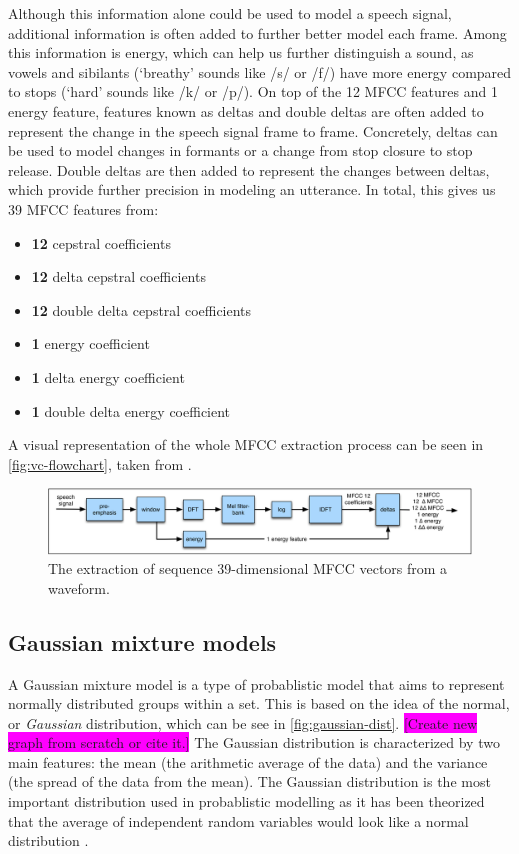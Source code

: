 \documentclass
[
    a4paper,
    twoside,
    12pt,
]
{report}
\begin{document}
Although this information alone could be used to model a speech signal,
additional information is often added to further better model each
frame. Among this information is energy, which can help us further
distinguish a sound, as vowels and sibilants (`breathy' sounds like /s/
or /f/) have more energy compared to stops (`hard' sounds like /k/ or
/p/). On top of the 12 MFCC features and 1 energy feature, features
known as deltas and double deltas are often added to represent the
change in the speech signal frame to frame. Concretely, deltas can be
used to model changes in formants or a change from stop closure to stop
release. Double deltas are then added to represent the changes between
deltas, which provide further precision in modeling an utterance. In
total, this gives us 39 MFCC features from:

\begin{itemize}
   \setlength\itemsep{-1em}
   \item{\textbf{12} cepstral coefficients}
   \item{\textbf{12} delta cepstral coefficients}
   \item{\textbf{12} double delta cepstral coefficients}
   \item{\textbf{1} energy coefficient}
   \item{\textbf{1} delta energy coefficient}
   \item{\textbf{1} double delta energy coefficient}
\end{itemize}

A visual representation of the whole MFCC extraction process can be seen
in \autoref{fig:vc-flowchart}, taken from \textcite{jurafsky2009}.

\begin{figure}[H]
\centering
\includegraphics[scale=0.24]{img/mfcc-extraction.png}
\caption{The extraction of sequence 39-dimensional MFCC vectors from a waveform.}
\label{fig:vc-flowchart}
\end{figure}

\subsection{Gaussian mixture models}

A Gaussian mixture model is a type of probablistic model that aims to
represent normally distributed groups within a set. This is based on the
idea of the normal, or \emph{Gaussian} distribution, which can be see in
\autoref{fig:gaussian-dist}.
\colorbox{magenta}{[Create new graph from scratch or cite it.]} The
Gaussian distribution is characterized by two main features: the mean
(the arithmetic average of the data) and the variance (the spread of the
data from the mean). The Gaussian distribution is the most important
distribution used in probablistic modelling as it has been theorized
that the average of independent random variables would look like a
normal distribution \parencite{mcgonagle2016}.
\end{document}
